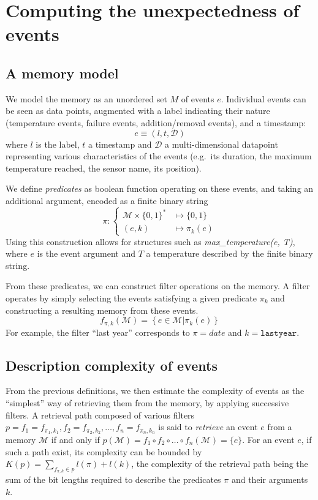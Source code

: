 \documentclass[conference]{IEEEtran}
\begin{document}
\section{Computing the unexpectedness of events}
\label{sec:computing}
\subsection{A memory model}
We model the memory as an unordered set $M$ of events $e$. Individual events can be seen as data points, augmented with a label indicating their nature (temperature events, failure events, addition/removal events), and a timestamp:
\begin{equation}
  e \equiv (l, t,\mathcal{D})
\end{equation}
where $l$ is the label, $t$ a timestamp and $\mathcal{D}$ a multi-dimensional datapoint representing various characteristics of the events (e.g.~its duration, the maximum temperature reached, the sensor name, its position).

We define \emph{predicates} as boolean function operating on these events, and taking an additional argument, encoded as a finite binary string
\begin{equation}
  \pi : \begin{cases}
    \mathcal{M}\times \{0,1\}^{*} &\mapsto \{0,1\} \\
    (e, k) &\mapsto \pi_{k}(e)
    \end{cases}
\end{equation}
Using this construction allows for structures such as \emph{max\_temperature(e, T)}, where $e$ is the event argument and $T$ a temperature described by the finite binary string.

From these predicates, we can construct filter operations on the memory. A filter operates by simply selecting the events satisfying a given predicate $\pi_{k}$ and constructing a resulting memory from these events.
\begin{equation}
 f_{\pi, k}(\mathcal{M}) = \left\{e \in \mathcal{M} | \pi_{k}(e) \right\}
\end{equation}
For example, the filter ``last year'' corresponds to $\pi = \mathit{date}$ and $k = \mathtt{last year}$.

\subsection{Description complexity of events}

From the previous definitions, we then estimate the complexity of events as the ``simplest'' way of retrieving them from the memory, by applying successive filters. A retrieval path composed of various filters $p = f_{1} = f_{\pi_{1}, k_{1}}, f_{2} = f_{\pi_{2}, k_{2}}, \dots, f_{n} = f_{\pi_{n}, k_{n}}$ is said to \emph{retrieve} an event $e$ from a memory $\mathcal{M}$ if and only if $p(\mathcal{M}) = f_{1} \circ f_{2} \circ \dots \circ f_{n} (\mathcal{M}) = \{e\}$. For an event $e$, if such a path exist, its complexity can be bounded by $K(p) = \sum_{f_{\pi, k} \in p} l(\pi) + l(k)$, the complexity of the retrieval path being the sum of the bit lengths required to describe the predicates $\pi$ and their arguments $k$.
\end{document}
